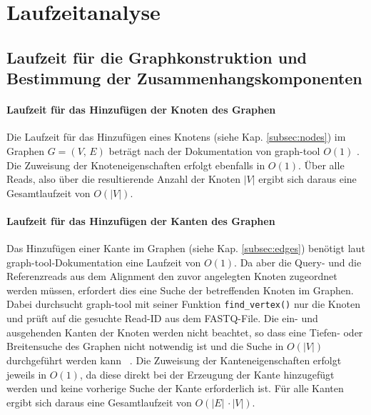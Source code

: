\chapter{Laufzeitanalyse} \label{sec:}

\section[Laufzeit für Graph und Zusammenhangskomponenten]{Laufzeit für die Graphkonstruktion und Bestimmung der Zusammenhangskomponenten} \label{sec:}
\subsubsection{Laufzeit für das Hinzufügen der Knoten des Graphen} \label{subsec:}
Die Laufzeit für das Hinzufügen eines Knotens (siehe Kap. \ref{subsec:nodes}) im Graphen $G=(V, \, E)$ beträgt nach der Dokumentation von graph-tool  $ O(1) $ \cite{docs_graph_tool}. Die Zuweisung der Knoteneigenschaften erfolgt ebenfalls in $ O(1) $. Über alle Reads, also über die resultierende Anzahl der Knoten $ |V| $ ergibt sich daraus eine Gesamtlaufzeit von $ O(|V|) $.\\

\subsubsection{Laufzeit für das Hinzufügen der Kanten des Graphen} \label{subsec:}

Das Hinzufügen einer Kante im Graphen (siehe Kap. \ref{subsec:edges}) benötigt laut graph-tool-Dokumentation \cite{docs_graph_tool} eine Laufzeit von $ O(1) $. Da aber die Query- und die Referenzreads aus dem Alignment den zuvor angelegten Knoten zugeordnet werden müssen, erfordert dies eine Suche der betreffenden Knoten im Graphen. Dabei durchsucht graph-tool mit seiner Funktion \lstinline|find_vertex()| nur die Knoten und prüft auf die gesuchte Read-ID aus dem FASTQ-File. Die ein- und ausgehenden Kanten der Knoten werden nicht beachtet, so dass eine Tiefen- oder Breitensuche des Graphen nicht notwendig ist und die Suche in $ O(|V|) $ durchgeführt werden kann ~\cite{graph_tool_coplexity_find_vertex}. Die Zuweisung der Kanteneigenschaften erfolgt jeweils in $ O(1) $, da diese direkt bei der Erzeugung der Kante hinzugefügt werden und keine vorherige Suche der Kante erforderlich ist. Für alle Kanten ergibt sich daraus eine Gesamtlaufzeit von $ O(|E|\, \cdotp |V|) $. \\


